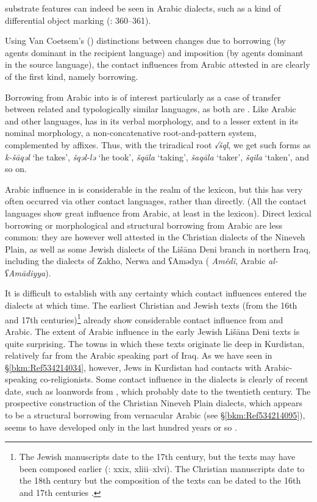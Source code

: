 \documentclass[output=paper]{langsci/langscibook}
\begin{document}
{substrate} features can indeed be seen in  Arabic dialects, such as a kind of {differential object marking} (\citealt{Coghill2014}: 360–361).

Using Van Coetsem’s (\citeyear{VanCoetsem1988,VanCoetsem2000}) distinctions between changes due to borrowing (by agents dominant in the {recipient language}) and {imposition} (by agents dominant in the {source language}), the contact influences from Arabic attested in  are clearly of the first kind, namely borrowing.

Borrowing from Arabic into  is of interest particularly as a case of {transfer} between related and typologically similar languages, as both are . Like Arabic and other  languages,  has in its verbal morphology, and to a lesser extent in its nominal morphology, a {non-concatenative} {root-and-pattern} system, complemented by affixes. Thus, with the triradical {root} \textit{√šql}, we get such forms as \textit{k-šāqəl} ‘he takes’, \textit{šqəl-lə} ‘he took’, \textit{šqāla} ‘taking’, \textit{šaqāla} ‘taker’, \textit{šqila} ‘taken’, and so on.

Arabic influence in  is considerable in the realm of the lexicon, but this has very often occurred via other contact languages, rather than directly. (All the contact languages show great influence from Arabic, at least in the lexicon). Direct lexical borrowing or morphological and structural borrowing from Arabic are less common: they are however well attested in the Christian dialects of the Nineveh Plain, as well as some Jewish dialects of the Lišāna Deni branch in northern Iraq, including the dialects of Zakho, Nerwa and ʕAmədya ( \textit{Amêdî}, Arabic \textit{al\nobreakdash-ʕAmādiyya}).

It is difficult to establish with any certainty which contact influences entered the dialects at which time. The earliest Christian and Jewish  texts (from the 16th and 17th centuries)\footnote{The Jewish manuscripts date to the 17th century, but the texts may have been composed earlier (\citealt{Sabar1976}: xxix, xliii–xlvi). The Christian manuscripts date to the 18th century but the composition of the texts can be dated to the 16th and 17th centuries \citep[16]{Mengozzi2002}.} already show considerable contact influence from  and Arabic. The extent of Arabic influence in the early Jewish Lišāna Deni texts \citep{Sabar1984} is quite surprising. The towns in which these texts originate lie deep in Kurdistan, relatively far from the Arabic speaking part of Iraq. As we have seen in §\ref{bkm:Ref534214034}, however, {Jews} in Kurdistan had contacts with Arabic-speaking co{}-religionists. Some contact influence in the  dialects is clearly of recent date, such as {loanwords} from , which probably date to the twentieth century. The {prospective} construction of the Christian Nineveh Plain dialects, which appears to be a structural borrowing from vernacular Arabic (see §\ref{bkm:Ref534214095}), seems to have developed only in the last hundred years or so \citep[375]{Coghill2010}.
\end{document}
